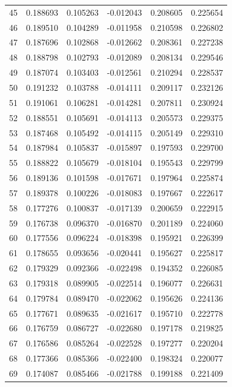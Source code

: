 \documentclass[a4paper, 12pt]{article}
\begin{document}
\begin{tabularx}{\linewidth}{|X|X|X|X|X|X|}
    45 & 0.188693 & 0.105263 & -0.012043 & 0.208605 & 0.225654 \\
    46 & 0.189510 & 0.104289 & -0.011958 & 0.210598 & 0.226802 \\
    47 & 0.187696 & 0.102868 & -0.012662 & 0.208361 & 0.227238 \\
    48 & 0.188798 & 0.102793 & -0.012089 & 0.208134 & 0.229546 \\
    49 & 0.187074 & 0.103403 & -0.012561 & 0.210294 & 0.228537 \\
    50 & 0.191232 & 0.103788 & -0.014111 & 0.209117 & 0.232126 \\
    51 & 0.191061 & 0.106281 & -0.014281 & 0.207811 & 0.230924 \\
    52 & 0.188551 & 0.105691 & -0.014113 & 0.205573 & 0.229375 \\
    53 & 0.187468 & 0.105492 & -0.014115 & 0.205149 & 0.229310 \\
    54 & 0.187984 & 0.105837 & -0.015897 & 0.197593 & 0.229700 \\
    55 & 0.188822 & 0.105679 & -0.018104 & 0.195543 & 0.229799 \\
    56 & 0.189136 & 0.101598 & -0.017671 & 0.197964 & 0.225874 \\
    57 & 0.189378 & 0.100226 & -0.018083 & 0.197667 & 0.222617 \\
    58 & 0.177276 & 0.100837 & -0.017139 & 0.200659 & 0.222915 \\
    59 & 0.176738 & 0.096370 & -0.016870 & 0.201189 & 0.224060 \\
    60 & 0.177556 & 0.096224 & -0.018398 & 0.195921 & 0.226399 \\
    61 & 0.178655 & 0.093656 & -0.020441 & 0.195627 & 0.225817 \\
    62 & 0.179329 & 0.092366 & -0.022498 & 0.194352 & 0.226085 \\
    63 & 0.179318 & 0.089905 & -0.022514 & 0.196077 & 0.226631 \\
    64 & 0.179784 & 0.089470 & -0.022062 & 0.195626 & 0.224136 \\
    65 & 0.177671 & 0.089635 & -0.021617 & 0.195710 & 0.222778 \\
    66 & 0.176759 & 0.086727 & -0.022680 & 0.197178 & 0.219825 \\
    67 & 0.176586 & 0.085264 & -0.022528 & 0.197277 & 0.220204 \\
    68 & 0.177366 & 0.085366 & -0.022400 & 0.198324 & 0.220077 \\
    69 & 0.174087 & 0.085466 & -0.021788 & 0.199188 & 0.221409 \\

\end{tabularx}
\end{document}
